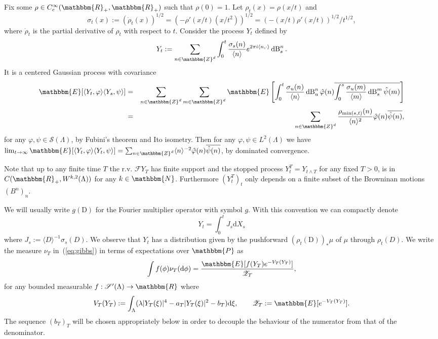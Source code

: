 \documentclass[11pt, oneside]{article}   	%
\newcommand{\assign}{:=}
\newcommand{\mathD}{\mathrm{D}}
\newcommand{\mathd}{\mathrm{d}}
\newcommand{\nocomma}{}
\newcommand{\tmop}[1]{\ensuremath{\operatorname{#1}}}
\newcommand{\CF}{\mathscr{F}}
\newcommand{\CS}{\mathscr{S}}
\newcommand{\CZ}{\mathscr{Z}}
\begin{document}
Fix some $\rho \in C_c^{\infty} (\mathbbm{R}_+, \mathbbm{R}_+)$ such that
$\rho (0) = 1$. Let $\rho_t (x) = \rho (x / t)$ and
\[ \sigma_t (x) \assign (\dot{\rho}_t (x))^{1 / 2} = (- \rho' (x / t) (x /
   t^2))^{1 / 2} = (- (x / t) \rho' (x / t))^{1 / 2} / t^{1 / 2}, \]
where $\dot{\rho}_t$ is the partial derivative of $\rho_t$ with respect to
$t$. Consider the process $Y_t$ defined by
\begin{equation}
  Y_t \assign \sum_{n \in \mathbbm{Z}^d} \int_0^t \frac{\sigma_s (n)}{\langle
  n \rangle} e^{2 \pi i \langle n, \cdot \rangle} \tmop{dB}^n_s .
  \label{eq:rep-Y}
\end{equation}
It is a centered Gaussian process with covariance
\begin{eqnarray*}
  \mathbbm{E} [\langle Y_t, \varphi \rangle \langle Y_s, \psi \rangle] & = &
  \sum_{n \in \mathbbm{Z}^d} \sum_{m \in \mathbbm{Z}^d} \mathbbm{E} \left[
  \int_0^t \frac{\sigma_u (n)}{\langle n \rangle} \tmop{dB}^n_u  \hat{\varphi}
  (n) \overline{\int_0^s \frac{\sigma_u (m)}{\langle m \rangle} \tmop{dB}^m_s 
  \hat{\psi} (m)} \right]\\
  & = & \sum_{n \in \mathbbm{Z}^d} \frac{\rho_{\min (s, t)} (n)}{\langle n
  \rangle^2} \hat{\varphi} (n) \overline{\hat{\psi} (n)},
\end{eqnarray*}
for any $\varphi, \psi \in \CS (\Lambda)$, by Fubini's theorem and Ito
isometry. Then for any $\varphi \nocomma, \psi \in L^2 (\Lambda)$ we have
$\lim_{t \rightarrow \infty} \mathbbm{E} [\langle Y_t, \varphi \rangle \langle
Y_t, \psi \rangle] = \sum_{n \in \mathbbm{Z}^d} \langle n \rangle^{- 2}
\hat{\varphi} (n) \overline{\hat{\psi} (n)}$, by dominated convergence.

Note that up to any finite time $T$ the r.v. $\mathcal{\CF} Y_T$ has finite
support and the stopped process $Y^T_t = Y_{t \wedge T}$ for any fixed $T >
0$, is in $C (\mathbbm{R}_+, W^{k, 2} (\Lambda))$ for any $k \in \mathbbm{N}$.
Furthermore $(Y^T_t)_t$ only depends on a finite subset of the Browninan
motions $(B^n)_n$.

We will usually write $g (\mathD)$ for the Fourier multiplier operator with
symbol $g$. With this convention we can compactly denote
\begin{equation}
  Y_t = \int_0^t J_s \mathd X_s \label{eq:def-Y}
\end{equation}
where $J_s \assign \langle D \rangle^{- 1} \sigma_s (D)$. We observe that
$Y_t$ has a distribution given by the pushforward $(\rho_t (\mathD))_{\ast}
\mu$ of $\mu$ through $\rho_t (D)$. We write the measure $\nu_T$
in~(\ref{eq:gibbs}) in terms of expectations over $\mathbbm{P}$ as
\begin{equation}
  \int f (\phi) \nu_T (\mathd \phi) = \frac{\mathbbm{E} [f (Y_T) e^{- V_T
  (Y_T)}]}{\CZ_T}, \label{eq:equiv}
\end{equation}
for any bounded measurable $f : \CS' (\Lambda) \rightarrow \mathbbm{R}$ where
\[ V_T (Y_T) \assign \int_{\Lambda} (\lambda | Y_T (\xi) |^4 - a_T  | Y_T
   (\xi) |^2 - b_T) \mathd \xi, \qquad \CZ_T \assign \mathbbm{E} [e^{- V_T
   (Y_T)}] . \]
The sequence $(b_T)_T$ will be chosen appropriately below in order to decouple
the behaviour of the numerator from that of the denominator.
\end{document}
